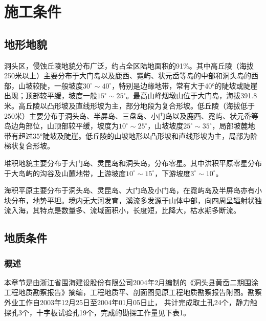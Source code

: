 \documentclass[UTF8, a4paper, 12pt]{ctexart} %
\begin{document}
\section{施工条件}
\subsection{地形地貌}
洞头区，侵蚀丘陵地貌分布广泛，约占全区陆地面积的91\%。其中高丘陵（海拔250米以上）主要分布于大门岛以及鹿西、霓屿、状元岙等岛的中部和洞头岛的西部，山坡较陡，一般坡度$30^{\circ}\sim40^{\circ}$，特别是边缘地带，常有大于40°的陡坡或陡崖出现；顶部较平缓，坡度一般$15^{\circ}\sim25^{\circ}$。最高山峰烟墩山位于大门岛，海拔391.8米。高丘陵以凸形坡及直线形坡为主，部分地段为复合形坡。低丘陵（海拔低于250米）主要分布于洞头岛、半屏岛、三盘岛、小门岛以及鹿西、霓屿、状元岙等岛边角部位，山顶部较平缓，坡度为$10^{\circ}\sim25^{\circ}$，山坡坡度$25^{\circ}\sim35^{\circ}$，局部坡麓地带有超过35°陡坡及陡崖。低丘陵的山坡地形以凸形坡和直线形坡为主，局部为阶梯状复合形坡。
\par 堆积地貌主要分布于大门岛、灵昆岛和洞头岛，分布零星。其中洪积平原零星分布于大岛屿的沟谷及山麓地带，上游坡度$10^{\circ}\sim15^{\circ}$，下游坡度$3^{\circ}\sim10^{\circ}$。
\par 海积平原主要分布于洞头岛、灵昆岛、大门岛及小门岛，在霓屿岛及半屏岛亦有小块分布，地势平坦。境内无大河发育，溪流多发源于山体中部，向四周呈辐射状独流入海，其特点是数量多、流域面积小，长度短，比降大，枯水期多断流。

\subsection{地质条件}
\subsubsection{概述}
本章节是由浙江省围海建设股份有限公司2004年2月编制的《洞头县黄岙二期围涂工程地质勘察报告》摘编，工程地质平、剖面图见原工程地质勘察报告附图。勘察外业工作自2003年12月25日至2004年01月05日止，
共计完成取土孔24个，静力触探孔3个，十字板试验孔19个，完成的勘探工作量见下表1。
\begin{table}[h]
    \centering
    \caption{堤线勘探工作量统计表}
    \label{tab:exploration_statistics}
\end{table}
\end{document}
